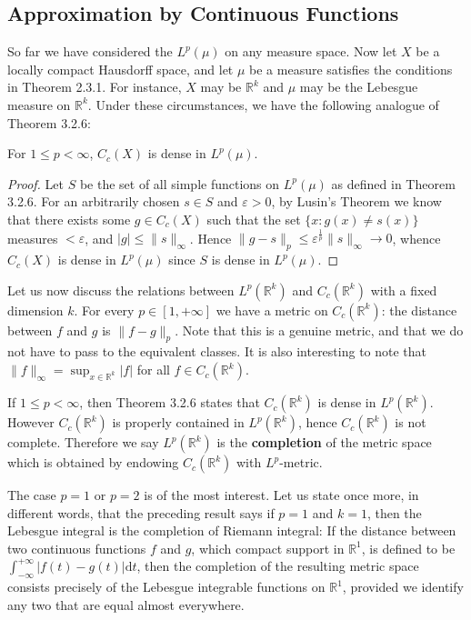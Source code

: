 \subsection{Approximation by Continuous Functions}
So far we have considered the $L^p(\mu)$ on any measure space. Now let $X$ be a locally compact Hausdorff space, and let $\mu$ be a measure satisfies the conditions in Theorem 2.3.1. For instance, $X$ may be $\mathbb{R}^k$ and $\mu$ may be the Lebesgue measure on $\mathbb{R}^k$. Under these circumstances, we have the following analogue of Theorem 3.2.6:
\begin{theorem}
For $1\le p<\infty$, $C_c(X)$ is dense in $L^p(\mu)$.
\end{theorem}
\begin{proof}
Let $S$ be the set of all simple functions on $L^p(\mu)$ as defined in Theorem 3.2.6. For an arbitrarily chosen $s\in S$ and $\varepsilon>0$, by Lusin's Theorem we know that there exists some $g\in C_c(X)$ such that the set $\{x:g(x)\ne s(x)\}$ measures $<\varepsilon$, and $|g|\le\|s\|_\infty$. Hence $\|g-s\|_p\le\varepsilon^{\frac{1}{p}}\|s\|_\infty\to 0$, whence $C_c(X)$ is dense in $L^p(\mu)$ since $S$ is dense in $L^p(\mu)$.
\end{proof}
Let us now discuss the relations between $L^p(\mathbb{R}^k)$ and $C_c(\mathbb{R}^k)$ with a fixed dimension $k$. For every $p\in[1,+\infty]$ we have a metric on $C_c(\mathbb{R}^k)$: the distance between $f$ and $g$ is $\|f-g\|_p$. Note that this is a genuine metric, and that we do not have to pass to the equivalent classes. It is also interesting to note that $\|f\|_\infty=\sup_{x\in\mathbb{R}^k}|f|$ for all $f\in C_c(\mathbb{R}^k)$.\par
If $1\le p<\infty$, then Theorem 3.2.6 states that $C_c(\mathbb{R}^k)$ is dense in $L^p(\mathbb{R}^k)$. However $C_c(\mathbb{R}^k)$ is properly contained in $L^p(\mathbb{R}^k)$, hence $C_c(\mathbb{R}^k)$ is not complete. Therefore we say $L^p(\mathbb{R}^k)$ is the \textbf{completion} of the metric space which is obtained by endowing $C_c(\mathbb{R}^k)$ with $L^p$-metric.\par
The case $p=1$ or $p=2$ is of the most interest. Let us state once more, in different words, that the preceding result says if $p=1$ and $k=1$, then the Lebesgue integral is the completion of Riemann integral: If the distance between two continuous functions $f$ and $g$, which compact support in $\mathbb{R}^1$, is defined to be $\int_{-\infty}^{+\infty}|f(t)-g(t)|\mathrm{d}t$, then the completion of the resulting metric space consists precisely of the Lebesgue integrable functions on $\mathbb{R}^1$, provided we identify any two that are equal almost everywhere.\par
